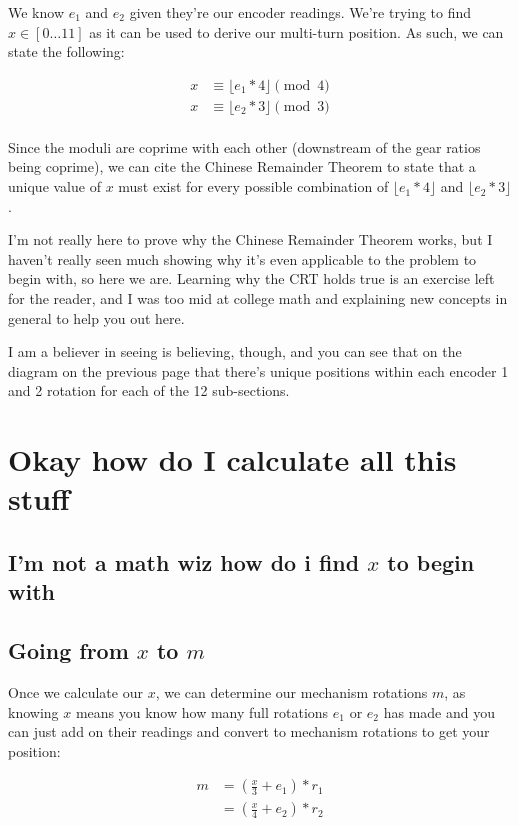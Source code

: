 \documentclass[11pt]{article}
\begin{document}
We know $e_1$ and $e_2$ given they're our encoder readings. 
We're trying to find $x \in [0\dots11]$ as it can be used to derive our multi-turn position.
As such, we can state the following:

\begin{align*}
    x &\equiv \lfloor e_1 * 4 \rfloor \pmod{4}\\
    x &\equiv \lfloor e_2 * 3 \rfloor \pmod{3}\\
\end{align*}

Since the moduli are coprime with each other (downstream of the gear ratios being coprime), we can cite the Chinese Remainder Theorem to state that a unique value of $x$ must exist for every possible combination of $\lfloor e_1 * 4 \rfloor$ and $\lfloor e_2 * 3 \rfloor$. 


I'm not really here to prove why the Chinese Remainder Theorem works, but I haven't really seen much showing why it's even applicable to the problem to begin with, so here we are.
Learning why the CRT holds true is an exercise left for the reader, and I was too mid at college math and explaining new concepts in general to help you out here.

I am a believer in seeing is believing, though, and you can see that on the diagram on the previous page that there's unique positions within each encoder 1 and 2 rotation for each of the 12 sub-sections.

\section{Okay how do I calculate all this stuff}

\subsection{I'm not a math wiz how do i find $x$ to begin with}

\subsection{Going from $x$ to $m$}

Once we calculate our $x$, we can determine our mechanism rotations $m$, as knowing $x$ means you know how many full rotations $e_1$ or $e_2$ has made and you can just add on their readings and convert to mechanism rotations to get your position:

\begin{align*}
    m &= \left(\frac{x}{3} + e_1\right) * r_1\\
    &= \left(\frac{x}{4} + e_2\right) * r_2\\
\end{align*}
\end{document}
